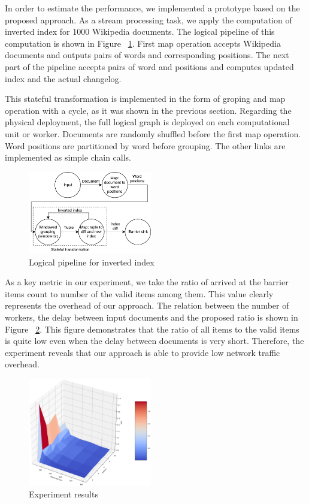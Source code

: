 
\label {fs-experiments}

In order to estimate the performance, we implemented a prototype based on the proposed approach. As a stream processing task, we apply the computation of inverted index for 1000 Wikipedia documents. The logical pipeline of this computation is shown in Figure ~\ref{inverted-index}. First map operation accepts Wikipedia documents and outputs pairs of words and corresponding positions. The next part of the pipeline accepts pairs of word and positions and computes updated index and the actual changelog. 

This stateful transformation is implemented in the form of groping and map operation with a cycle, as it was shown in the previous section. Regarding the physical deployment, the full logical graph is deployed on each computational unit or worker. Documents are randomly shuffled before the first map operation. Word positions are partitioned by word before grouping. The other links are implemented as simple chain calls.

\begin{figure}[htbp]
  \centering
  \includegraphics[width=0.48\textwidth]{pics/inverted-index}
  \caption{Logical pipeline for inverted index}
  \label {inverted-index}
\end{figure}

As a key metric in our experiment, we take the ratio of arrived at the barrier items count to number of the valid items among them. This value clearly represents the overhead of our approach. The relation between the number of workers, the delay between input documents and the proposed ratio is shown in Figure ~\ref{experiment}. This figure demonstrates that the ratio of all items to the valid items is quite low even when the delay between documents is very short. Therefore, the experiment reveals that our approach is able to provide low network traffic overhead. 

\begin{figure}[htbp]
  \centering
  \includegraphics[width=0.48\textwidth]{pics/experiment}
  \caption{Experiment results}
  \label {experiment}
\end{figure}
